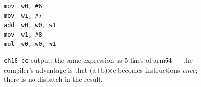 \begin{figure}[htbp]
\centering
\begin{verbatim}
mov  w0, #6
mov  w1, #7
add  w0, w0, w1
mov  w1, #8
mul  w0, w0, w1
\end{verbatim}
\caption{\texttt{ch18\_cc} output: the same expression as 5 lines of
arm64 --- the compiler's advantage is that (a$+$b)$\times$c
becomes instructions \emph{once}; there is no dispatch in the
result.}
\label{fig:compile18}
\end{figure}
